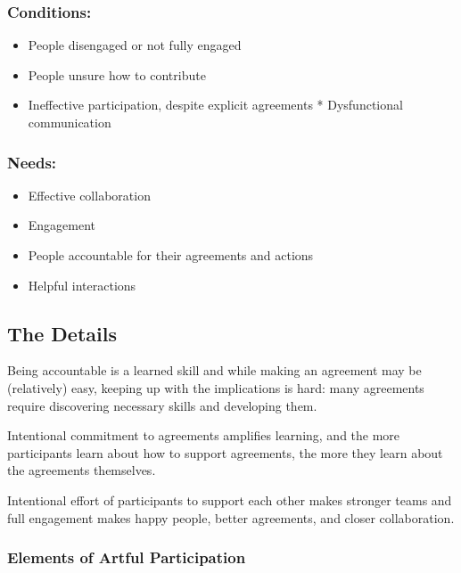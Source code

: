 \subsubsection{Conditions:}
\label{conditions:}

\begin{itemize}
\item People disengaged or not fully engaged

\item People unsure how to contribute

\item Ineffective participation, despite explicit agreements * Dysfunctional communication

\end{itemize}

\subsubsection{Needs:}
\label{needs:}

\begin{itemize}
\item Effective collaboration

\item Engagement

\item People accountable for their agreements and actions

\item Helpful interactions

\end{itemize}

\subsection{The Details}
\label{thedetails}

Being accountable is a learned skill and while making an agreement may be (relatively) easy, keeping up with the implications is hard: many agreements require discovering necessary skills and developing them.

Intentional commitment to agreements amplifies learning, and the more participants learn about how to support agreements, the more they learn about the agreements themselves.

Intentional effort of participants to support each other makes stronger teams and full engagement makes happy people, better agreements, and closer collaboration.

\subsubsection{Elements of Artful Participation}
\label{elementsofartfulparticipation}

